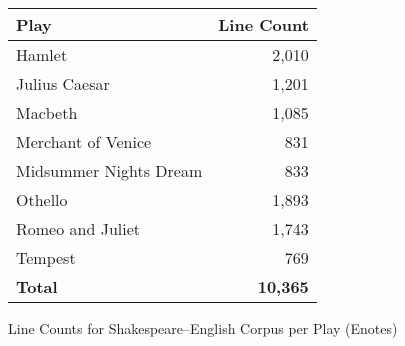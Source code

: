 \documentclass[twoside,twocolumn]{article}
\begin{document}
\begin{figure}[ht]
    \centering
    \begin{tabular}{ |l|r| }
        \hline
        \textbf{Play}
          & \textbf{Line Count} \\
        \hline
        Hamlet & 2,010 \\ \hline
        Julius Caesar & 1,201 \\ \hline
        Macbeth & 1,085 \\ \hline
        Merchant of Venice & 831 \\ \hline
        Midsummer Nights Dream & 833 \\ \hline
        Othello & 1,893 \\ \hline
        Romeo and Juliet & 1,743 \\ \hline
        Tempest & 769 \\ \hline
        \textbf{Total} & \textbf{10,365} \\ \hline
    \end{tabular}

    \caption{Line Counts for Shakespeare--English Corpus per Play (Enotes)}
    \label{fig:data-lines-enotes}
\end{figure}
\end{document}
